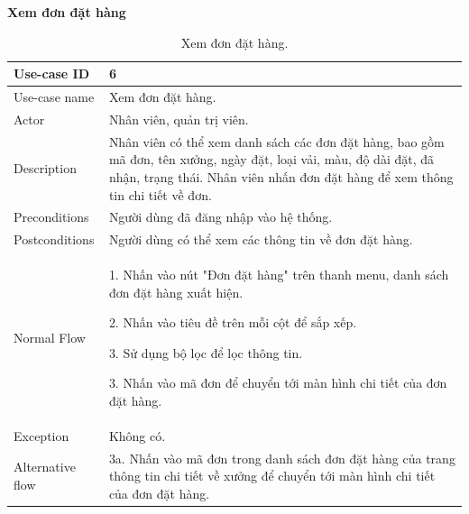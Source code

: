 \textbf{Xem đơn đặt hàng}
\begin{table}[!htp]
    \centering
    \begin{tabular}{|m{3cm}|m{10cm}|}
    \hline 
        Use-case ID & 6\\ \hline
        Use-case name & Xem đơn đặt hàng.\\ \hline
        Actor & Nhân viên, quản trị viên.\\ \hline
        Description & Nhân viên có thể xem danh sách các đơn đặt hàng, bao gồm mã đơn, tên xưởng, ngày đặt, loại vải, màu, độ dài đặt, đã nhận, trạng thái. Nhân viên nhấn đơn đặt hàng để xem thông tin chi tiết về đơn.\\ \hline
        Preconditions & Người dùng đã đăng nhập vào hệ thống.\\ \hline
        Postconditions & Người dùng có thể xem các thông tin về đơn đặt hàng.\\ \hline
        Normal Flow & 
        1. Nhấn vào nút "Đơn đặt hàng" trên thanh menu, danh sách đơn đặt hàng xuất hiện.\par
        2. Nhấn vào tiêu đề trên mỗi cột để sắp xếp.\par
        3. Sử dụng bộ lọc để lọc thông tin.\par
        3. Nhấn vào mã đơn để chuyển tới màn hình chi tiết của đơn đặt hàng.
        \\ \hline
        Exception & Không có.\\ \hline
        Alternative flow & 
        3a. Nhấn vào mã đơn trong danh sách đơn đặt hàng của trang thông tin chi tiết về xưởng để chuyển tới màn hình chi tiết của đơn đặt hàng.
        \\ 
    \hline 
    \end{tabular}
    \caption{Xem đơn đặt hàng.}
    \label{bang6}
\end{table}

